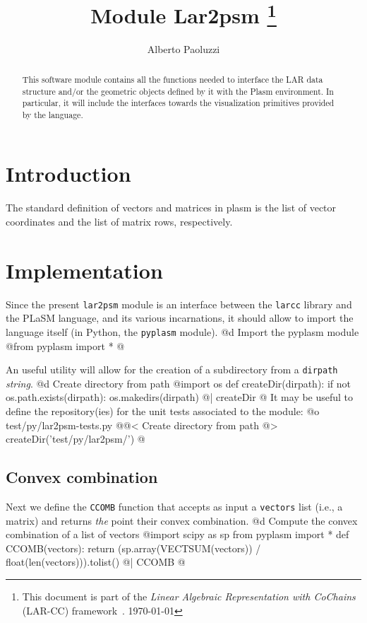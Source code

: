 \documentclass[11pt,oneside]{article}	%
\title{Module Lar2psm
\footnote{This document is part of the \emph{Linear Algebraic Representation with CoChains} (LAR-CC) framework~\cite{cclar-proj:2013:00}. \today}
}
\author{Alberto Paoluzzi}
\begin{document}
\maketitle
\nonstopmode

\begin{abstract}
This software module contains all the functions needed to interface the LAR data structure and/or the geometric  objects defined by it with the Plasm environment. In particular, it will include the interfaces towards the visualization primitives provided by the language.
\end{abstract}

\tableofcontents
\newpage


\section{Introduction}
The standard definition of vectors and matrices in plasm is the list of vector coordinates and the list of matrix rows, respectively.

\section{Implementation}
Since the present \texttt{lar2psm} module is an interface between the \texttt{larcc} library and the PLaSM language, and its various incarnations, it should allow to import the language itself (in Python, the \texttt{pyplasm} module). 
@d Import the pyplasm module
@{from pyplasm import * 
@}

An useful utility will allow for the creation of a subdirectory from a \texttt{dirpath} \emph{string}.
@d Create directory from path 
@{import os
def createDir(dirpath):
    if not os.path.exists(dirpath):
        os.makedirs(dirpath)
@| createDir @}
It may be useful to define the repository(ies) for the unit tests associated to the module:
@o test/py/lar2psm-tests.py
@{@< Create directory from path @>
createDir('test/py/lar2psm/')
@}


\subsection{Convex combination}
Next we define the \texttt{CCOMB} function that accepts as input a \texttt{vectors} list (i.e., a matrix) and returns \emph{the} point their convex combination.
@d Compute the convex combination of a list of vectors
@{import scipy as sp
from pyplasm import *
def CCOMB(vectors):
    return (sp.array(VECTSUM(vectors)) / float(len(vectors))).tolist()  
@| CCOMB @}
\end{document}

